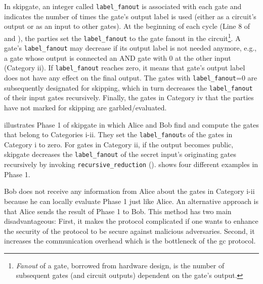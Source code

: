 In \gls{skipgate}, an integer called \texttt{label\_fanout} is associated with each gate and indicates the number of times the gate's output label is used (either as a circuit's output or as an input to other gates).
At the beginning of each cycle (Line 8 of  and ), the parties set the \texttt{label\_fanout} to the gate fanout in the circuit\footnote{\textit{Fanout} of a gate, borrowed from hardware design, is the number of subsequent gates (and circuit outputs) dependent on the gate’s output.}.
A gate's \texttt{label\_fanout} may decrease if its output label is not needed anymore, e.g., a gate whose output is connected an AND gate with 0 at the other input (Category ii).
If \texttt{label\_fanout} reaches zero, it means that gate's output label does not have any effect on the final output.
The gates with \texttt{label\_fanout}=0 are subsequently designated for skipping, which in turn decreases the \texttt{label\_fanout} of their input gates recursively.
Finally, the gates in Category iv that the parties have not marked for skipping are garbled/evaluated.

\begin{algorithm}
\caption{Phase 1 in \gls{skipgate} for both Alice and Bob sides.}\label{alg:phase1}
\begin{algorithmic}[1]
		\ENDIF
	\ENDIF
\ENDFOR
\end{algorithmic}
\end{algorithm}

 illustrates Phase 1 of \gls{skipgate} in which Alice and Bob find and compute the gates that belong to Categories i-ii.
They set the \texttt{label\_fanout}s of the gates in Category i to zero.
For gates in Category ii, if the output becomes public, \gls{skipgate} decreases the \texttt{label\_fanout} of the secret input's originating gates recursively by invoking \texttt{recursive\_reduction} ().
 shows four different examples in Phase 1.

Bob does not receive any information from Alice about the gates in Category i-ii because he can locally evaluate Phase 1 just like Alice.
An alternative approach is that Alice sends the result of Phase 1 to Bob.
This method has two main disadvantageous:
First, it makes the protocol complicated if one wants to enhance the security of the protocol to be secure against malicious adversaries.
Second, it increases the communication overhead which is the bottleneck of the \acrshort{gc} protocol.

